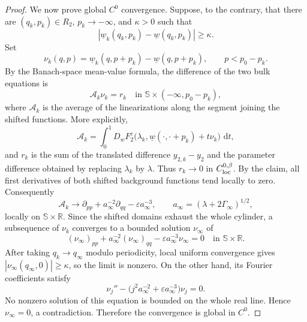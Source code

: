 \documentclass[11pt,reqno]{amsart}
\numberwithin{equation}{section}
\newcommand{\dd}{\,\mathrm{d}}
\theoremstyle{definition}
\theoremstyle{remark}
\begin{document}
\begin{proof}
We now prove global $C^0$ convergence.  Suppose, to the contrary,
that there are $(q_k,p_k)\in R_2$, $p_k\to-\infty$, and $\kappa>0$
such that
\[
 |\underline w_k(q_k,p_k)-\underline w(q_k,p_k)|\geq\kappa.
\]
Set
\[
 \nu_k(q,p)=\underline w_k(q,p+p_k)
             -\underline w(q,p+p_k),
 \qquad p<p_0-p_k.
\]
By the Banach-space mean-value formula, the difference of the two
bulk equations is
\[
 \mathscr A_k\nu_k=r_k
 \quad\text{in }\mathbb S\times(-\infty,p_0-p_k),
\]
where $\mathscr A_k$ is the average of the linearizations along the
segment joining the shifted functions.  More explicitly,
\[
 \mathscr A_k
 =\int_0^1D_wF_2^\varepsilon
 \bigl(\lambda_k,
 \underline w(\cdot,\cdot+p_k)+t\nu_k\bigr)\,\dd t,
\]
and $r_k$ is the sum of the translated difference $y_{2,k}-y_2$
and the parameter difference obtained by replacing $\lambda_k$ by
$\lambda$.  Thus $r_k\to0$ in $C^{0,\beta}_{\rm loc}$.  By the
claim, all first derivatives of both shifted background functions
tend locally to zero.  Consequently
\[
 \mathscr A_k\longrightarrow
 \partial_{pp}+a_\infty^{-2}\partial_{qq}
 -\varepsilon a_\infty^{-3},
 \qquad a_\infty=(\lambda+2\Gamma_\infty)^{1/2},
\]
locally on $\mathbb S\times\mathbb R$.  Since the shifted domains
exhaust the whole cylinder, a subsequence of $\nu_k$ converges to a
bounded solution $\nu_\infty$ of
\[
 (\nu_\infty)_{pp}+a_\infty^{-2}(\nu_\infty)_{qq}
 -\varepsilon a_\infty^{-3}\nu_\infty=0
 \quad\text{in }\mathbb S\times\mathbb R.
\]
After taking $q_k\to q_\infty$ modulo periodicity, local uniform
convergence gives
$|\nu_\infty(q_\infty,0)|\geq\kappa$, so the limit is nonzero.
On the other hand, its Fourier coefficients satisfy
\[
 \nu_j''-
 \bigl(j^2a_\infty^{-2}+\varepsilon a_\infty^{-3}\bigr)\nu_j=0.
\]
No nonzero solution of this equation is bounded on the whole real
line.  Hence $\nu_\infty=0$, a contradiction.  Therefore the
convergence is global in $C^0$.


\end{proof}
\end{document}
